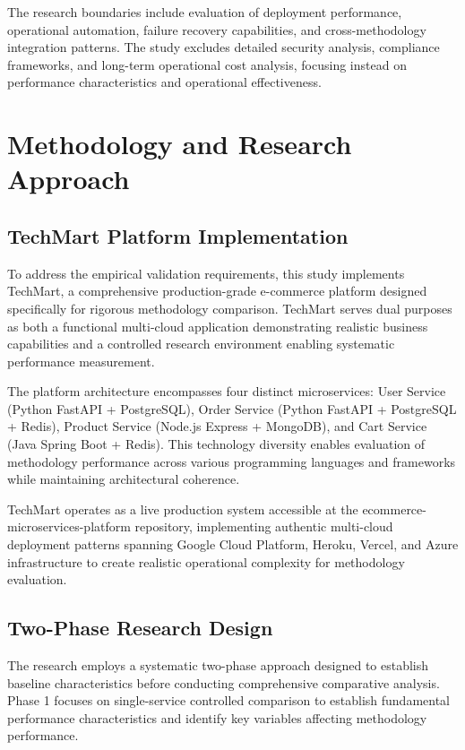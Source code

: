 The research boundaries include evaluation of deployment performance, operational automation, failure recovery capabilities, and cross-methodology integration patterns. The study excludes detailed security analysis, compliance frameworks, and long-term operational cost analysis, focusing instead on performance characteristics and operational effectiveness.

\section{Methodology and Research Approach}

\subsection{TechMart Platform Implementation}
To address the empirical validation requirements, this study implements TechMart, a comprehensive production-grade e-commerce platform designed specifically for rigorous methodology comparison. TechMart serves dual purposes as both a functional multi-cloud application demonstrating realistic business capabilities and a controlled research environment enabling systematic performance measurement.

The platform architecture encompasses four distinct microservices: User Service (Python FastAPI + PostgreSQL), Order Service (Python FastAPI + PostgreSQL + Redis), Product Service (Node.js Express + MongoDB), and Cart Service (Java Spring Boot + Redis). This technology diversity enables evaluation of methodology performance across various programming languages and frameworks while maintaining architectural coherence.

TechMart operates as a live production system accessible at the ecommerce-microservices-platform repository, implementing authentic multi-cloud deployment patterns spanning Google Cloud Platform, Heroku, Vercel, and Azure infrastructure to create realistic operational complexity for methodology evaluation.

\subsection{Two-Phase Research Design}
The research employs a systematic two-phase approach designed to establish baseline characteristics before conducting comprehensive comparative analysis. Phase 1 focuses on single-service controlled comparison to establish fundamental performance characteristics and identify key variables affecting methodology performance.

